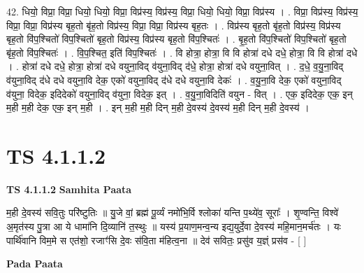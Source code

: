 \documentclass[17pt]{extarticle}
\begin{document}
42. धियो॒ विप्रा॒ विप्रा॒ धियो॒ धियो॒ विप्रा॒ विप्र॑स्य॒ विप्र॑स्य॒ विप्रा॒ धियो॒ धियो॒ विप्रा॒ विप्र॑स्य । . विप्रा॒ विप्र॑स्य॒ विप्र॑स्य॒ विप्रा॒ विप्रा॒ विप्र॑स्य बृह॒तो बृ॑ह॒तो विप्र॑स्य॒ विप्रा॒ विप्रा॒ विप्र॑स्य बृह॒तः । . विप्र॑स्य बृह॒तो बृ॑ह॒तो विप्र॑स्य॒ विप्र॑स्य बृह॒तो वि॑प॒श्चितो॑ विप॒श्चितो॑ बृह॒तो विप्र॑स्य॒ विप्र॑स्य बृह॒तो वि॑प॒श्चितः॑ । . बृ॒ह॒तो वि॑प॒श्चितो॑ विप॒श्चितो॑ बृह॒तो बृ॑ह॒तो वि॑प॒श्चितः॑ । . वि॒प॒श्चित॒ इति॑ विप॒श्चितः॑ । . वि होत्रा॒ होत्रा॒ वि वि होत्रा॑ दधे दधे॒ होत्रा॒ वि वि होत्रा॑ दधे । . होत्रा॑ दधे दधे॒ होत्रा॒ होत्रा॑ दधे वयुना॒विद् व॑युना॒विद् द॑धे॒ होत्रा॒ होत्रा॑ दधे वयुना॒वित् । . द॒धे॒ व॒यु॒ना॒विद् व॑युना॒विद् द॑धे दधे वयुना॒वि देक॒ एको॑ वयुना॒विद् द॑धे दधे वयुना॒वि देकः॑ । . व॒यु॒ना॒वि देक॒ एको॑ वयुना॒विद् व॑युना॒ विदेक॒ इदिदेको॑ वयुना॒विद् व॑युना॒ विदेक॒ इत् । . व॒यु॒ना॒विदिति॑ वयुन - वित् । . एक॒ इदिदेक॒ एक॒ इन् म॒ही म॒ही देक॒ एक॒ इन् म॒ही । . इन् म॒ही म॒ही दिन् म॒ही दे॒वस्य॑ दे॒वस्य॑ म॒ही दिन् म॒ही दे॒वस्य॑ । \newline
\pagebreak
{}

\section{ TS 4.1.1.2 }

\textbf{TS 4.1.1.2 } \newline
\textbf{Samhita Paata} \newline

म॒ही दे॒वस्य॑ सवि॒तुः परि॑ष्टुतिः ॥ यु॒जे वां॒ ब्रह्म॑ पू॒र्व्यं नमो॑भि॒र्वि श्लोका॑ यन्ति प॒थ्ये॑व॒ सूराः᳚ । शृ॒ण्वन्ति॒ विश्वे॑ अ॒मृत॑स्य पु॒त्रा आ ये धामा॑नि दि॒व्यानि॑ त॒स्थुः ॥ यस्य॑ प्र॒याण॒मन्व॒न्य इद्य॒युर्दे॒वा दे॒वस्य॑ महि॒मान॒मर्च॑तः । यः पार्थि॑वानि विम॒मे स एत॑शो॒ रजाꣳ॑सि दे॒वः स॑वि॒ता म॑हित्व॒ना ॥ देव॑ सवितः॒ प्रसु॑व य॒ज्ञ्ं प्रस॑व - [  ] \newline

\textbf{Pada Paata} \newline
\end{document}

